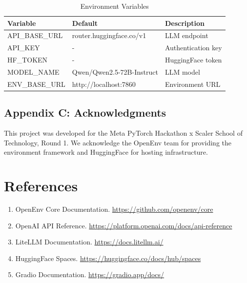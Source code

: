 \documentclass[12pt,a4paper]{article}
\begin{document}
\begin{table}[H]
	\centering
	\caption{Environment Variables}
	\begin{tabular}{@{}lll@{}}
		\toprule
		\textbf{Variable} & \textbf{Default}          & \textbf{Description} \\
		\midrule
		API\_BASE\_URL    & router.huggingface.co/v1  & LLM endpoint         \\
		API\_KEY          & -                         & Authentication key   \\
		HF\_TOKEN         & -                         & HuggingFace token    \\
		MODEL\_NAME       & Qwen/Qwen2.5-72B-Instruct & LLM model            \\
		ENV\_BASE\_URL    & http://localhost:7860     & Environment URL      \\
		\bottomrule
	\end{tabular}
\end{table}

\subsection{Appendix C: Acknowledgments}

This project was developed for the Meta PyTorch Hackathon x Scaler School of Technology, Round 1. We acknowledge the OpenEnv team for providing the environment framework and HuggingFace for hosting infrastructure.

\newpage

\section*{References}

\begin{enumerate}
	\item OpenEnv Core Documentation. \url{https://github.com/openenv/core}
	\item OpenAI API Reference. \url{https://platform.openai.com/docs/api-reference}
	\item LiteLLM Documentation. \url{https://docs.litellm.ai/}
	\item HuggingFace Spaces. \url{https://huggingface.co/docs/hub/spaces}
	\item Gradio Documentation. \url{https://gradio.app/docs/}
\end{enumerate}
\end{document}
